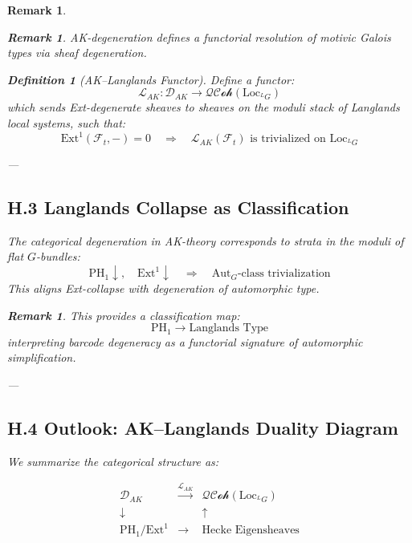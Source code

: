 \documentclass[11pt]{article}
\newtheorem{definition}[theorem]{Definition}
\newtheorem{remark}[theorem]{Remark}
\begin{document}
\begin{remark}
\begin{remark}
AK-degeneration defines a functorial resolution of motivic Galois types via sheaf degeneration.
\end{remark}

\begin{definition}[AK–Langlands Functor]
Define a functor:
\[
\mathcal{L}_{AK} : \mathcal{D}_{AK} \longrightarrow \mathcal{QCoh}(\mathrm{Loc}_{^LG})
\]
which sends Ext-degenerate sheaves to sheaves on the moduli stack of Langlands local systems, such that:
\[
\mathrm{Ext}^1(\mathcal{F}_t, -) = 0 \quad \Rightarrow \quad \mathcal{L}_{AK}(\mathcal{F}_t) \text{ is trivialized on } \mathrm{Loc}_{^LG}
\]
\end{definition}

---

\subsection*{H.3 Langlands Collapse as Classification}

\begin{proposition}
The categorical degeneration in AK-theory corresponds to strata in the moduli of flat \( G \)-bundles:
\[
\text{PH}_1 \downarrow,\quad \mathrm{Ext}^1 \downarrow \quad \Rightarrow \quad \mathrm{Aut}_G\text{-class trivialization}
\]
This aligns Ext-collapse with degeneration of automorphic type.
\end{proposition}

\begin{remark}
This provides a classification map:
\[
\mathrm{PH}_1 \to \text{Langlands Type}
\]
interpreting barcode degeneracy as a functorial signature of automorphic simplification.
\end{remark}

---

\subsection*{H.4 Outlook: AK–Langlands Duality Diagram}

We summarize the categorical structure as:

\[
\begin{array}{ccc}
\mathcal{D}_{AK} & \xrightarrow{\mathcal{L}_{AK}} & \mathcal{QCoh}(\mathrm{Loc}_{^LG}) \\
\downarrow & & \uparrow \\
\mathrm{PH}_1 / \mathrm{Ext}^1 & \longrightarrow & \text{Hecke Eigensheaves}
\end{array}
\]


\end{remark}
\end{document}
